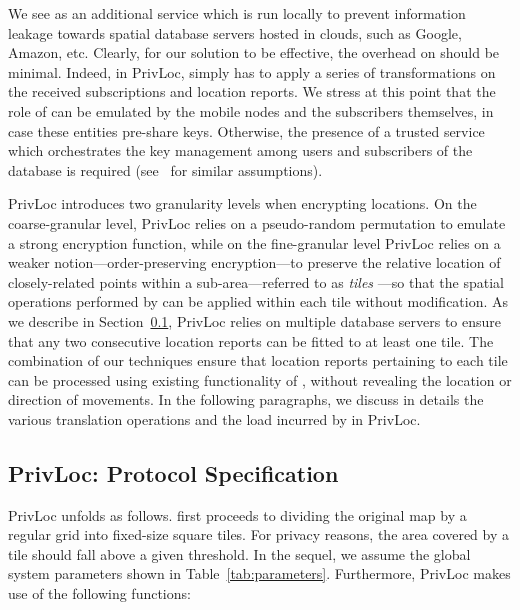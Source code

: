 \documentclass{llncs}
\newcommand\sol{{\sf PrivLoc}}
\begin{document}
We see  as an additional service which is run locally to prevent information leakage towards spatial database servers hosted in clouds, such as Google, Amazon, etc.
Clearly, for our solution to be effective, the overhead on  should be minimal. Indeed, in \sol,  simply
has to apply a series of transformations on the received subscriptions and location reports. We stress at this point that the role of  can be emulated by the mobile nodes and the subscribers themselves, in case
these entities pre-share keys. Otherwise, the presence of a trusted service which orchestrates the key management among users and subscribers of the database is required (see~\cite{Chow:2007:EPC:1784462.1784477,Bamba:2008:SAL:1367497.1367531,Gruteser:2003:AUL:1066116.1189037,Kalnis:2007:PLI:1313047.1313203,DBLP:conf/infocom/WangXHZLX12} for similar assumptions).


\sol{} introduces
two granularity levels when encrypting locations. On the coarse-granular level, \sol{} relies on a pseudo-random permutation to emulate a strong encryption function, while on the fine-granular level \sol{} relies on
a weaker notion---order-preserving encryption---to preserve the relative location of closely-related points within a sub-area---referred to as \emph{tiles}
---so that the spatial operations performed by  can be applied within each tile
without modification. As we describe in Section~\ref{subsec:spec}, \sol{} relies on multiple database servers to ensure that any two consecutive location reports can be fitted to at least one tile. The combination
of our techniques ensure
that location reports pertaining to each tile can be processed using existing functionality of , without revealing the location or direction of movements. In the following paragraphs, we discuss in details the various translation operations and the load incurred by  in \sol.




\subsection{PrivLoc: Protocol Specification}\label{subsec:spec}

\sol{} unfolds as follows.  first proceeds to dividing the original map by a regular grid into fixed-size square tiles. For privacy reasons, the area covered by a tile should fall above a given threshold. In the sequel, we assume the global system parameters shown in Table~\ref{tab:parameters}. Furthermore, \sol{} makes use of the following functions:
\end{document}
